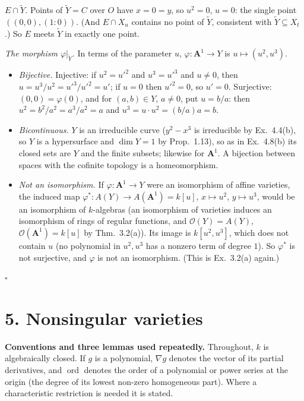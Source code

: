 \documentclass[11pt]{article}
\begin{document}
\emph{$E\cap\tilde Y$.} Points of $\tilde Y=C$ over $O$ have $x=0=y$, so $u^2=0$, $u=0$: the single point $((0,0),(1:0))$. (And $E\cap X_u$ contains no point of $\tilde Y$, consistent with $\tilde Y\subseteq X_t$.) So $E$ meets $\tilde Y$ in exactly one point.

\emph{The morphism $\varphi|_{\tilde Y}$.} In terms of the parameter $u$, $\varphi:\mathbf A^1\to Y$ is $u\mapsto(u^2,u^3)$.
\begin{itemize}
\item \emph{Bijective.} Injective: if $u^2=u'^2$ and $u^3=u'^3$ and $u\neq0$, then $u=u^3/u^2=u'^3/u'^2=u'$; if $u=0$ then $u'^2=0$, so $u'=0$. Surjective: $(0,0)=\varphi(0)$, and for $(a,b)\in Y$, $a\ne0$, put $u=b/a$: then $u^2=b^2/a^2=a^3/a^2=a$ and $u^3=u\cdot u^2=(b/a)a=b$.
\item \emph{Bicontinuous.} $Y$ is an irreducible curve ($y^2-x^3$ is irreducible by Ex.~4.4(b), so $Y$ is a hypersurface and $\dim Y=1$ by Prop.~1.13), so as in Ex.~4.8(b) its closed sets are $Y$ and the finite subsets; likewise for $\mathbf A^1$. A bijection between spaces with the cofinite topology is a homeomorphism.
\item \emph{Not an isomorphism.} If $\varphi:\mathbf A^1\to Y$ were an isomorphism of affine varieties, the induced map $\varphi^*:A(Y)\to A(\mathbf A^1)=k[u]$, $x\mapsto u^2$, $y\mapsto u^3$, would be an isomorphism of $k$-algebras (an isomorphism of varieties induces an isomorphism of rings of regular functions, and $\mathcal O(Y)=A(Y)$, $\mathcal O(\mathbf A^1)=k[u]$ by Thm.~3.2(a)). Its image is $k[u^2,u^3]$, which does not contain $u$ (no polynomial in $u^2,u^3$ has a nonzero term of degree $1$). So $\varphi^*$ is not surjective, and $\varphi$ is not an isomorphism. (This is Ex.~3.2(a) again.)
\end{itemize}
\hfill$\square$

\section*{5. Nonsingular varieties}

\textbf{Conventions and three lemmas used repeatedly.} Throughout, $k$ is algebraically closed. If $g$ is a polynomial, $\nabla g$ denotes the vector of its partial derivatives, and $\operatorname{ord}$ denotes the order of a polynomial or power series at the origin (the degree of its lowest non-zero homogeneous part). Where a characteristic restriction is needed it is stated.
\end{document}
